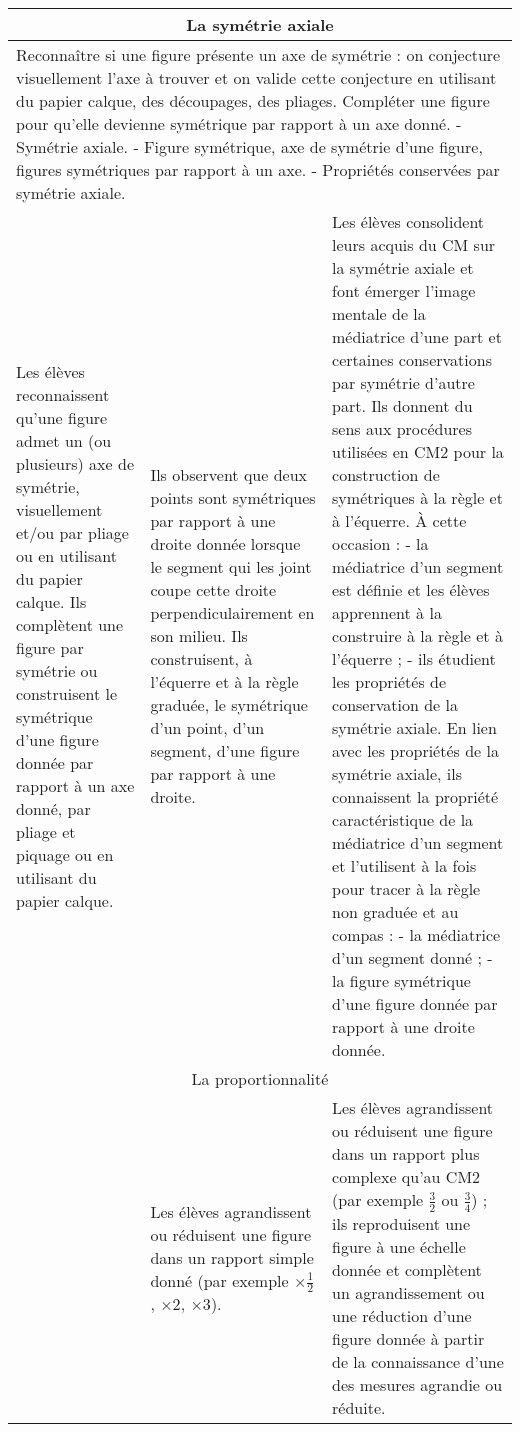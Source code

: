 \documentclass[11pt]{article}
\newcommand{\souscategorie}[1]{\hline\multicolumn{3}{|c|}{\color{or}\sffamily\phantom{É}#1\phantom{É}\rmfamily}\\\hline}
\newcommand{\note}[1]{\hline\multicolumn{3}{|p{18.6cm}|}{#1} \\ \hline}
\newenvironment{programme}
{
    \setlength{\arrayrulewidth}{0.5pt}
    \arrayrulecolor{or}
    \begin{center}
    \begin{tabular}{|p{6.4cm}|p{6.4cm}|p{6.4cm}|}
}
{
    \hline
    \end{tabular}
    \end{center}
}
\begin{document}
\begin{programme}
    \souscategorie{La symétrie axiale} 
    \note{Reconnaître si une figure présente un axe de symétrie : on conjecture visuellement l’axe à trouver et on valide cette conjecture en utilisant du papier calque, des découpages, des pliages. Compléter une figure pour qu'elle devienne symétrique par rapport à un axe donné. - Symétrie axiale. - Figure symétrique, axe de symétrie d’une figure, figures symétriques par rapport à un axe. - Propriétés conservées par symétrie axiale.} 
    Les élèves reconnaissent qu’une figure admet un (ou plusieurs) axe de symétrie, visuellement et/ou par pliage ou en utilisant du papier calque. Ils complètent une figure par symétrie ou construisent le symétrique d’une figure donnée par rapport à un axe donné, par pliage et piquage ou en utilisant du papier calque. & Ils observent que deux points sont symétriques par rapport à une droite donnée lorsque le segment qui les joint coupe cette droite perpendiculairement en son milieu. Ils construisent, à l’équerre et à la règle graduée, le symétrique d’un point, d’un segment, d’une figure par rapport à une droite. & Les élèves consolident leurs acquis du CM sur la symétrie axiale et font émerger l’image mentale de la médiatrice d’une part et certaines conservations par symétrie d’autre part. Ils donnent du sens aux procédures utilisées en CM2 pour la construction de symétriques à la règle et à l’équerre. À cette occasion : - la médiatrice d’un segment est définie et les élèves apprennent à la construire à la règle et à l’équerre ; - ils étudient les propriétés de conservation de la symétrie axiale. En lien avec les propriétés de la symétrie axiale, ils connaissent la propriété caractéristique de la médiatrice d’un segment et l’utilisent à la fois pour tracer à la règle non graduée et au compas : - la médiatrice d’un segment donné ; - la figure symétrique d’une figure donnée par rapport à une droite donnée. \\
    \souscategorie{La proportionnalité} 
    & Les élèves agrandissent ou réduisent une figure dans un rapport simple donné (par exemple $\times\frac{1}{2}$, $\times 2$, $\times 3$). & Les élèves agrandissent ou réduisent une figure dans un rapport plus complexe qu’au CM2 (par exemple $\frac{3}{2}$ ou $\frac{3}{4}$) ; ils reproduisent une figure à une échelle donnée et complètent un agrandissement ou une réduction d’une figure donnée à partir de la connaissance d’une des mesures agrandie ou réduite. \\
\end{programme}
\end{document}

